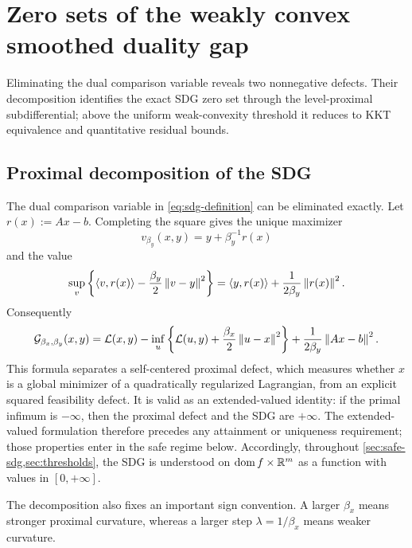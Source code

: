 \section{Zero sets of the weakly convex smoothed duality gap}
\label{sec:safe-sdg}

Eliminating the dual comparison variable reveals two nonnegative defects.
Their decomposition identifies the exact SDG zero set through the
level-proximal subdifferential; above the uniform weak-convexity threshold it
reduces to KKT equivalence and quantitative residual bounds.

\subsection{Proximal decomposition of the SDG}

The dual comparison variable in \cref{eq:sdg-definition} can be eliminated
exactly.  Let \(r(x):=Ax-b\).  Completing the square gives the unique
maximizer
\begin{equation}
  v_{\beta_y}(x,y)
  =
  y+\beta_y^{-1}r(x)
  \label{eq:dual-comparison-maximizer}
\end{equation}
and the value
\[
  \sup_v\left\{\left\langle v,r(x)\right\rangle
    -\frac{\beta_y}{2}\left\lVert v-y\right\rVert^2\right\}
  =\left\langle y,r(x)\right\rangle+\frac{1}{2\beta_y}\left\lVert r(x)\right\rVert^2.
\]
Consequently
\begin{equation}
  \mathcal{G}_{\beta_x,\beta_y}(x,y)
  =
  \mathcal{L}(x,y)
  -\inf_u\left\{\mathcal{L}(u,y)
       +\frac{\beta_x}{2}\left\lVert u-x\right\rVert^2\right\}
  +\frac{1}{2\beta_y}\left\lVert Ax-b\right\rVert^2.
  \label{eq:sdg-decomposition}
\end{equation}
This formula separates a self-centered proximal defect, which measures whether
\(x\) is a global minimizer of a quadratically regularized Lagrangian, from an
explicit squared feasibility defect.  It is valid as an extended-valued
identity: if the primal infimum is \(-\infty\), then the proximal defect and
the SDG are \(+\infty\).  The extended-valued formulation therefore precedes
any attainment or uniqueness requirement; those properties enter in the
safe regime below.
Accordingly, throughout \cref{sec:safe-sdg,sec:thresholds}, the SDG is
understood on \(\operatorname{dom} f\times\mathbb{R}^m\) as a function with values in
\([0,+\infty]\).

The decomposition also fixes an important sign convention.  A larger
\(\beta_x\) means stronger proximal curvature, whereas a larger step
\(\lambda=1/\beta_x\) means weaker curvature.

